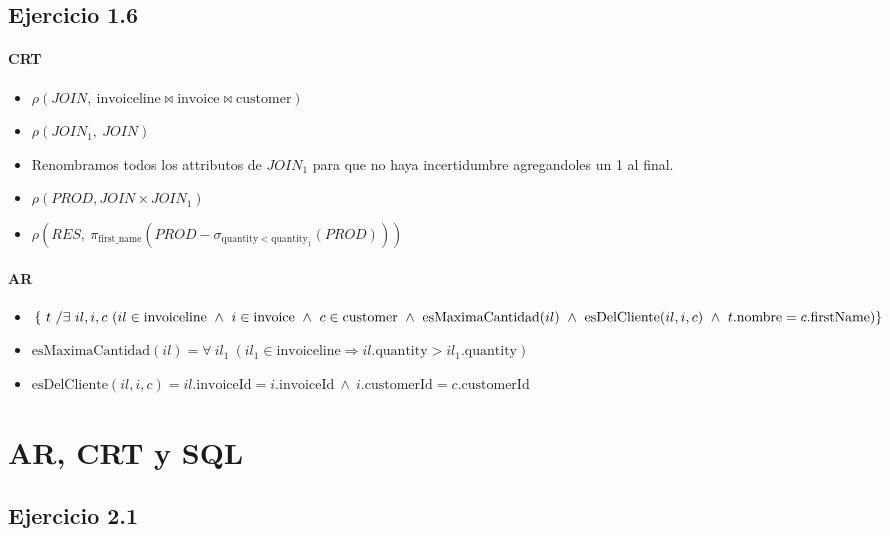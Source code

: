 \newpage
	\subsection{Ejercicio 1.6}
\paragraph{CRT}
\begin{itemize}
	\item[] $\rho(JOIN,~ \text{invoiceline} \bowtie \text{invoice} \bowtie \text{customer})$
	\item[] $\rho(JOIN_1,~JOIN)$
	\item[] Renombramos todos los attributos de $JOIN_1$ para que no haya incertidumbre agregandoles un 1 al final.
	\item[] $\rho(PROD, JOIN \times JOIN_1)$
	\item[] $\rho(RES,~\pi_{\text{first\_name}}(PROD - \sigma_{\text{quantity} < \text{quantity}_1}(PROD)))$
\end{itemize}

\paragraph{AR}
\begin{itemize}
	\item [] $\{~t~/ \exists~il,i,c~( il\in \text{invoiceline}~\land~i\in \text{invoice}~\land~c\in \text{customer}~\land~ \text{esMaximaCantidad}(il)~\land~\text{esDelCliente}(il,i,c)\\ ~\land~t.\text{nombre} = c.\text{firstName})\}$
	\item[] $\text{esMaximaCantidad}(il) = \forall~il_1~( il_1\in \text{invoiceline} \Rightarrow il.\text{quantity} > il_1.\text{quantity})$
	\item[] $\text{esDelCliente}(il,i,c) = il.\text{invoiceId} = i.\text{invoiceId}~\land~ i.\text{customerId} = c.\text{customerId}$
\end{itemize}
\section{AR, CRT y SQL}
\subsection{Ejercicio 2.1}
	\subsubsection{}
